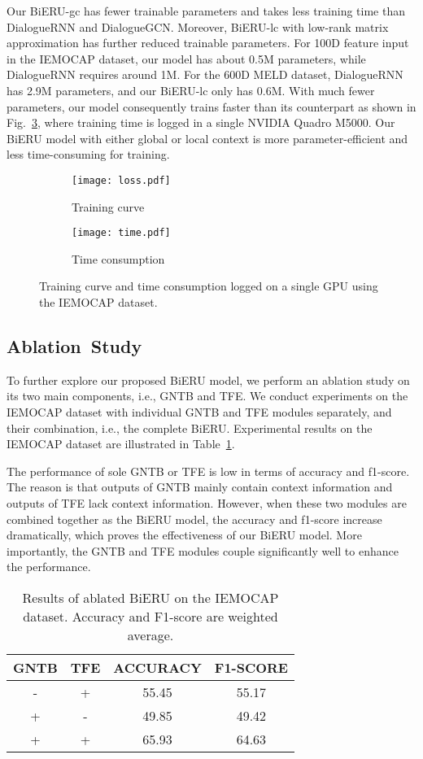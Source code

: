 \documentclass[journal]{IEEEtran}
\begin{document}
{Our BiERU-gc has fewer trainable parameters and takes less training time than DialogueRNN and DialogueGCN.}
Moreover, BiERU-lc with low-rank matrix approximation has further reduced trainable parameters.
For 100D feature input in the IEMOCAP dataset, our model has about 0.5M parameters, while DialogueRNN requires around 1M. 
For the 600D MELD dataset, DialogueRNN has 2.9M parameters, and our BiERU-lc only has 0.6M. 
With much fewer parameters, our model consequently trains faster than its counterpart as shown in Fig.~\ref{fig:time}, where training time is logged in a single NVIDIA Quadro M5000. 
Our BiERU model with either global or local context is more parameter-efficient and less time-consuming for training.



\begin{figure}[ht!]
\centering
\begin{subfigure}{0.45\textwidth}
    \texttt{[image: loss.pdf]}
    \caption{Training curve}
    \label{fig:loss}
\end{subfigure}{}
\begin{subfigure}{0.45\textwidth}
    \texttt{[image: time.pdf]}
    \caption{Time consumption}
    \label{fig:time}
\end{subfigure}
\linespread{1}
\caption{Training curve and time consumption logged on a single GPU using the IEMOCAP dataset.}
\end{figure}{}

\subsection{Ablation~Study}
To further explore our proposed BiERU model, we perform an ablation study on its two main components, i.e., GNTB and TFE. We conduct experiments on the IEMOCAP dataset with individual GNTB and TFE modules separately, and their combination, i.e., the complete BiERU. Experimental results on the IEMOCAP dataset are illustrated in Table~\ref{tab:ablation}.

The performance of sole GNTB or TFE is low in terms of accuracy and f1-score. The reason is that outputs of GNTB mainly contain context information and outputs of TFE lack context information. However, when these two modules are combined together as the BiERU model, the accuracy and f1-score increase dramatically, which proves the effectiveness of our BiERU model. More importantly, the GNTB and TFE modules couple significantly well to enhance the performance.
\begin{table}[!h]
\small
    \centering
    \begin{tabular}{|c|c|c|c|}
    \toprule
    GNTB & TFE & ACCURACY & F1-SCORE \\
    \midrule
     - & + & 55.45 &  55.17 \\
     + & - & 49.85 & 49.42\\
     + & + & 65.93 & 64.63 \\
    \bottomrule
    \end{tabular}
    \linespread{1}
    \caption{Results of ablated BiERU on the IEMOCAP dataset. Accuracy and F1-score are weighted average.}
    \label{tab:ablation}
\end{table}{}
\end{document}
